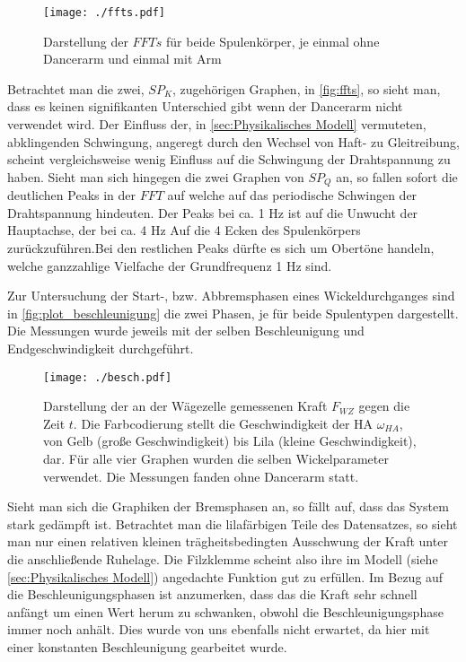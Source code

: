 \begin{figure}[H]
    \centering
    \texttt{[image: ./ffts.pdf]}
    \caption{Darstellung der $FFTs$ für beide Spulenkörper, je einmal ohne Dancerarm und einmal mit Arm}
    \label{fig:ffts}
\end{figure}

Betrachtet man die zwei, $SP_K$, zugehörigen Graphen, in \autoref{fig:ffts}, so sieht man, dass es keinen signifikanten Unterschied gibt wenn der Dancerarm nicht verwendet wird.
Der Einfluss der, in \autoref{sec:Physikalisches Modell} vermuteten, abklingenden Schwingung, angeregt durch den Wechsel von Haft- zu Gleitreibung, scheint vergleichsweise wenig Einfluss auf die Schwingung der Drahtspannung zu haben.
Sieht man sich hingegen die zwei Graphen von $SP_Q$ an, so fallen sofort die deutlichen Peaks in der $FFT$ auf  welche auf das periodische Schwingen der Drahtspannung hindeuten. Der Peaks bei ca. 1 Hz ist auf die Unwucht der Hauptachse, der bei ca. 4 Hz Auf die 4 Ecken des Spulenkörpers zurückzuführen.Bei den restlichen Peaks dürfte es sich um Obertöne handeln, welche ganzzahlige Vielfache der Grundfrequenz 1 Hz sind.\newline

Zur Untersuchung der Start-, bzw. Abbremsphasen eines Wickeldurchganges sind in \autoref{fig:plot_beschleunigung} die zwei Phasen, je für beide Spulentypen dargestellt. Die Messungen wurde jeweils mit der selben Beschleunigung und Endgeschwindigkeit durchgeführt.


\begin{figure}[H]
    \centering
    \texttt{[image: ./besch.pdf]}
    \caption{Darstellung der an der Wägezelle gemessenen Kraft $F_{WZ}$ gegen die Zeit $t$. Die Farbcodierung stellt die Geschwindigkeit der HA $\omega_{HA}$, von Gelb (große Geschwindigkeit) bis Lila (kleine Geschwindigkeit), dar. Für alle vier Graphen wurden die selben Wickelparameter verwendet. Die Messungen fanden ohne Dancerarm statt.}
    \label{fig:plot_beschleunigung}
\end{figure}

Sieht man sich die Graphiken der Bremsphasen an, so fällt auf, dass das System stark gedämpft ist. Betrachtet man die lilafärbigen Teile des Datensatzes, so sieht man nur einen relativen kleinen trägheitsbedingten Ausschwung der Kraft unter die anschließende Ruhelage. Die Filzklemme scheint also ihre im Modell (siehe \autoref{sec:Physikalisches Modell}) angedachte Funktion gut zu erfüllen. Im Bezug auf die Beschleunigungsphasen ist anzumerken, dass das die Kraft sehr schnell anfängt um einen Wert herum zu schwanken, obwohl die Beschleunigungsphase immer noch anhält. Dies wurde von uns ebenfalls nicht erwartet, da hier mit einer konstanten Beschleunigung gearbeitet wurde.  



